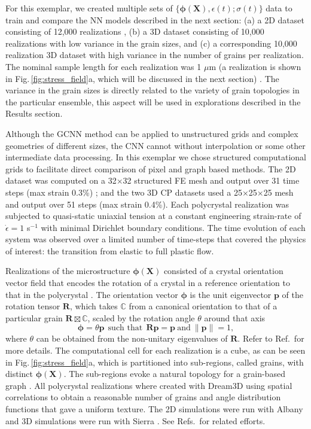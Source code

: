 \documentclass[12pt,reqno]{article}
\newcommand{\ADD}[1]{{#1}}
\newcommand{\fref}[1]{Fig.\,\ref{#1}}
\newcommand{\cref}[1]{Ref.\,\cite{#1}}
\newcommand{\crefs}[1]{Refs.\,\cite{#1}}
\newcommand{\Cbb}{\mathbb{C}}
\newcommand{\pb}{\mathbf{p}}
\newcommand{\Rb}{\mathbf{R}}
\newcommand{\Xb}{\mathbf{X}}
\newcommand{\phib}{{\boldsymbol{\phi}}}
\begin{document}
For this exemplar, we created multiple sets of $\{ \phib(\Xb), \epsilon(t); \sigma(t) \}$ data to train and compare the NN models described in the next section:
(a) a 2D dataset consisting of 12,000 realizations \cite{frankel2019oligocrystals},
(b) a 3D dataset consisting of 10,000 realizations with low variance in the grain sizes, and
(c) a corresponding 10,000 realization 3D dataset with high variance in the number of grains per realization.
\ADD{
The nominal sample length for each realization was 1 $\mu$m (a realization is shown in \fref{fig:stress_field}a, which will be discussed in the next section) .
}
The variance in the grain sizes is directly related to the variety of grain topologies in the particular ensemble, this aspect will be used in explorations described in the Results section.

\ADD{
Although the GCNN method can be applied to unstructured grids and complex geometries of different sizes, the CNN cannot without interpolation or some other intermediate data processing.
In this exemplar we chose structured computational grids to facilitate direct comparison of pixel and graph based  methods.
The 2D dataset was computed on a 32$\times$32 structured FE mesh and output over 31 time steps (max strain 0.3\%) ; and
the two 3D CP datasets used a 25$\times$25$\times$25 mesh and output over 51 steps (max strain 0.4\%).
Each polycrystal realization was subjected to quasi-static uniaxial tension at a constant engineering strain-rate of $\dot{\epsilon} = 1$ s$^{-1}$ with minimal Dirichlet boundary conditions.
The time evolution of each system was observed over a limited number of time-steps that covered the physics of interest: the transition from elastic to full plastic flow.
}

Realizations of the microstructure $\phib(\Xb)$ consisted of a crystal orientation vector field that encodes the rotation of a crystal in a reference orientation to that in the polycrystal \cite{frankel2019oligocrystals}.
The orientation vector $\phib$ is the unit eigenvector $\pb$ of the rotation tensor $\Rb$, which takes $\Cbb$ from a canonical orientation to that of a particular grain $\Rb \boxtimes \Cbb$, scaled by the rotation angle $\theta$ around that axis
\begin{equation}
\phib = \theta \pb \ \ \text{such that} \ \ \Rb \pb = \pb \ \text{and} \ \| \pb \| = 1 ,
\end{equation}
where $\theta$ can be obtained from the non-unitary eigenvalues of $\Rb$.
Refer to \cref{frankel2019oligocrystals} for more details.
The computational cell for each realization is a cube, as can be seen in \fref{fig:stress_field}a, which is partitioned into sub-regions, called grains, with distinct $\phib(\Xb)$.
The sub-regions evoke a natural topology for a grain-based graph \cite{vlassis2020geometric}.
All polycrystal realizations where created with Dream3D \cite{dream3d} using spatial correlations to obtain a reasonable number of grains and angle distribution functions that gave a uniform texture.
The 2D simulations were run with Albany \cite{albany} and 3D simulations were run with Sierra \cite{sierra}.
\ADD{
See \crefs{jones2018machine,frankel2019predicting,frankel2020prediction} for related efforts.
}
\end{document}
